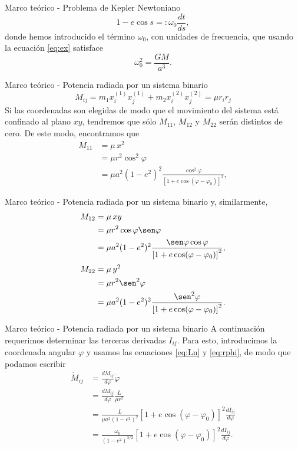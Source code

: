\begin{frame}{Marco teórico - Problema de Kepler Newtoniano}
    \begin{equation}
        1-e\cos s =: \omega_0 \frac{dt}{ds}, \label{eq:dtds}
    \end{equation}
    donde hemos introducido el término $\omega_0$, con unidades de frecuencia, que usando la ecuación \ref{eq:ex} satisface 
    \begin{equation}\label{eq:Kepler3}
        \omega_0^2=\frac{GM}{a^3}.    
    \end{equation}
\end{frame}
\begin{frame}{Marco teórico - Potencia radiada por un sistema binario}
    \begin{equation*}
        M_{ij}=m_1x_i^{(1)}x_{j}^{(1)}+m_2x_i^{(2)}x_{j}^{(2)}=\mu r_ir_j
    \end{equation*}
    Si las coordenadas son elegidas de modo que el movimiento del sistema está confinado al plano $xy$, tendremos que sólo $M_{11}$, $M_{12}$ y $M_{22}$ serán distintos de cero. De este modo, encontramos que
    \begin{align*}
    M_{11} & = \mu\, x^2\\
    & = \mu r^2\cos^2\varphi \\
    & = \mu a^2(1-e^2)^2\frac{\cos^2\varphi}{\left[1+e\cos(\varphi-\varphi_0)\right]^2},
    \end{align*}
\end{frame}
\begin{frame}{Marco teórico - Potencia radiada por un sistema binario}
    y, similarmente,
    \begin{align*}
    M_{12} & = \mu\, xy \\
    & = \mu r^2\cos\varphi\sen\varphi \\
    & = \mu a^2(1-e^2)^2\frac{\sen\varphi\cos\varphi}{\left[1+e\cos(\varphi-\varphi_0)\right]^2},
    \end{align*}
    \begin{align*}
    M_{22} & = \mu\, y^2 \\
    & = \mu r^2\sen^2\varphi \\
    & = \mu a^2(1-e^2)^2\frac{\sen^2\varphi}{\left[1+e\cos(\varphi-\varphi_0)\right]^2}.
    \end{align*}   
\end{frame}
\begin{frame}{Marco teórico - Potencia radiada por un sistema binario}
    A continuación requerimos determinar las terceras derivadas $\dddot{I}_{ij}$. Para esto, introducimos la coordenada angular $\varphi$ y usamos las ecuaciones \ref{eq:Ln} y \ref{eq:rphi}, de modo que podamos escribir
\begin{align*}
\dot{M}_{ij} &= \frac{dM_{ij}}{d\varphi}\dot{\varphi} \\
&= \frac{dM_{ij}}{d\varphi}\frac{L}{\mu r^2} \\
&= \frac{L}{\mu a^2(1-e^2)^2}\left[1+e\cos(\varphi-\varphi_0)\right]^2 \frac{dI_{ij}}{d\varphi}\\
&= \frac{\omega_0}{(1-e^2)^{3/2}}\left[1+e\cos(\varphi-\varphi_0)\right]^2 \frac{dI_{ij}}{d\varphi}.
\end{align*}
\end{frame}
